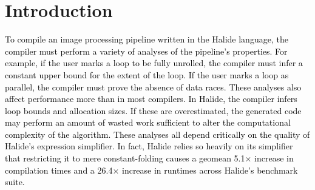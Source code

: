 \documentclass[acmsmall,review]{acmart}\settopmatter{printfolios=true,printccs=false,printacmref=false}
\newcommand{\modified}[1]{\textcolor{black}{{#1}}}
\begin{document}




\maketitle


\section{Introduction}
\label{sec:introduction}
\modified{To compile an image processing pipeline written in the
  Halide language, the compiler must perform a variety of analyses of
  the pipeline's properties. For example, if the user marks a
  loop to be fully unrolled, the compiler must infer a constant upper
  bound for the extent of the loop. If the user marks
  a loop as parallel, the compiler must prove the absence of data
  races. These analyses also affect performance more than in most
  compilers. In Halide, the compiler infers loop bounds and allocation sizes.
  If these are overestimated, the generated code may
  perform an amount of wasted work sufficient to alter the
  computational complexity of the algorithm. These analyses all depend
  critically on the quality of Halide's expression simplifier. In
  fact, Halide relies so heavily on its simplifier that restricting it
  to mere constant-folding causes a geomean 5.1$\times$ increase in
  compilation times and a 26.4$\times$ increase in runtimes across
  Halide's benchmark suite.  }

\end{document}
